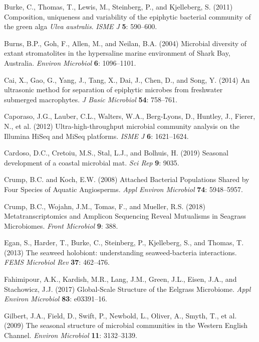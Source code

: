 \documentclass[12pt,]{article}
\begin{document}
\leavevmode\hypertarget{ref-Burke2011b}{}%
Burke, C., Thomas, T., Lewis, M., Steinberg, P., and Kjelleberg, S.
(2011) Composition, uniqueness and variability of the epiphytic
bacterial community of the green alga \emph{Ulva australis}. \emph{ISME
J} \textbf{5}: 590--600.

\leavevmode\hypertarget{ref-Burns2004}{}%
Burns, B.P., Goh, F., Allen, M., and Neilan, B.A. (2004) Microbial
diversity of extant stromatolites in the hypersaline marine environment
of Shark Bay, Australia. \emph{Environ Microbiol} \textbf{6}:
1096--1101.

\leavevmode\hypertarget{ref-Cai2014}{}%
Cai, X., Gao, G., Yang, J., Tang, X., Dai, J., Chen, D., and Song, Y.
(2014) An ultrasonic method for separation of epiphytic microbes from
freshwater submerged macrophytes. \emph{J Basic Microbiol} \textbf{54}:
758--761.

\leavevmode\hypertarget{ref-Caporaso2012}{}%
Caporaso, J.G., Lauber, C.L., Walters, W.A., Berg-Lyons, D., Huntley,
J., Fierer, N., et al. (2012) Ultra-high-throughput microbial community
analysis on the Illumina HiSeq and MiSeq platforms. \emph{ISME J}
\textbf{6}: 1621--1624.

\leavevmode\hypertarget{ref-Cardoso2019}{}%
Cardoso, D.C., Cretoiu, M.S., Stal, L.J., and Bolhuis, H. (2019)
Seasonal development of a coastal microbial mat. \emph{Sci Rep}
\textbf{9}: 9035.

\leavevmode\hypertarget{ref-Crump2008}{}%
Crump, B.C. and Koch, E.W. (2008) Attached Bacterial Populations Shared
by Four Species of Aquatic Angiosperms. \emph{Appl Environ Microbiol}
\textbf{74}: 5948--5957.

\leavevmode\hypertarget{ref-Crump2018}{}%
Crump, B.C., Wojahn, J.M., Tomas, F., and Mueller, R.S. (2018)
Metatranscriptomics and Amplicon Sequencing Reveal Mutualisms in
Seagrass Microbiomes. \emph{Front Microbiol} \textbf{9}: 388.

\leavevmode\hypertarget{ref-Egan2013}{}%
Egan, S., Harder, T., Burke, C., Steinberg, P., Kjelleberg, S., and
Thomas, T. (2013) The seaweed holobiont: understanding seaweed-bacteria
interactions. \emph{FEMS Microbiol Rev} \textbf{37}: 462--476.

\leavevmode\hypertarget{ref-Fahimipour2017}{}%
Fahimipour, A.K., Kardish, M.R., Lang, J.M., Green, J.L., Eisen, J.A.,
and Stachowicz, J.J. (2017) Global-Scale Structure of the Eelgrass
Microbiome. \emph{Appl Environ Microbiol} \textbf{83}: e03391--16.

\leavevmode\hypertarget{ref-Gilbert2009}{}%
Gilbert, J.A., Field, D., Swift, P., Newbold, L., Oliver, A., Smyth, T.,
et al. (2009) The seasonal structure of microbial communities in the
Western English Channel. \emph{Environ Microbiol} \textbf{11}:
3132--3139.
\end{document}

